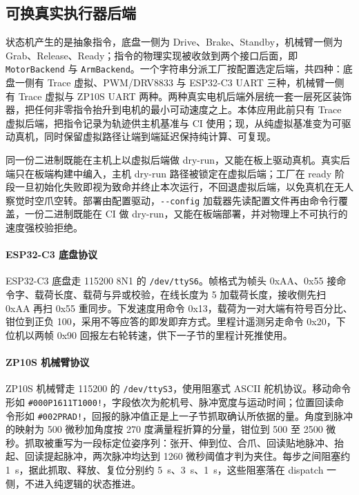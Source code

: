 \subsection{可换真实执行器后端}


状态机产生的是抽象指令，底盘一侧为 Drive、Brake、Standby，机械臂一侧为 Grab、Release、Ready；指令的物理实现被收敛到两个接口后面，即 \texttt{MotorBackend} 与 \texttt{ArmBackend}。一个字符串分派工厂按配置选定后端，共四种：底盘一侧有 Trace 虚拟、PWM/DRV8833 与 ESP32-C3 UART 三种，机械臂一侧有 Trace 虚拟与 ZP10S UART 两种。两种真实电机后端外层统一套一层死区装饰器，把任何非零指令抬升到电机的最小可动速度之上。本体应用此前只有 Trace 虚拟后端，把指令记录为轨迹供主机基准与 CI 使用；现，从纯虚拟基准变为可驱动真机，同时保留虚拟路径让端到端延迟保持纯计算、可复现。

同一份二进制既能在主机上以虚拟后端做 dry-run，又能在板上驱动真机。真实后端只在板端构建中编入，主机 dry-run 路径被锁定在虚拟后端；工厂在 ready 阶段一旦初始化失败即视为致命并终止本次运行，不回退虚拟后端，以免真机在无人察觉时空爪空转。部署由配置驱动，\texttt{-{}-config} 加载器先读配置文件再由命令行覆盖，一份二进制既能在 CI 做 dry-run，又能在板端部署，并对物理上不可执行的速度强校验拒绝。

\paragraph{ESP32-C3 底盘协议}
ESP32-C3 底盘走 115200 8N1 的 \texttt{/dev/ttyS6}。帧格式为帧头 0xAA、0x55 接命令字、载荷长度、载荷与异或校验，在线长度为 5 加载荷长度，接收侧先扫 0xAA 再扫 0x55 重同步。下发速度用命令 0x13，载荷为一对大端有符号百分比、钳位到正负 100，采用不等应答的即发即弃方式。里程计遥测另走命令 0x20，下位机以两帧 0x90 回报左右轮转速，供下一子节的里程计死推使用。

\paragraph{ZP10S 机械臂协议}
ZP10S 机械臂走 115200 的 \texttt{/dev/ttyS3}，使用阻塞式 ASCII 舵机协议。移动命令形如 \texttt{\#000P1611T1000!}，字段依次为舵机号、脉冲宽度与运动时间；位置回读命令形如 \texttt{\#002PRAD!}，回报的脉冲值正是上一子节抓取确认所依据的量。角度到脉冲的映射为 500 微秒加角度按 270 度满量程折算的分量，钳位到 500 至 2500 微秒。抓取被重写为一段标定位姿序列：张开、伸到位、合爪、回读贴地脉冲、抬起、回读提起脉冲，两次脉冲均达到 1260 微秒阈值才判为夹住。每步之间阻塞约 1~s，据此抓取、释放、复位分别约 5~s、3~s、1~s，这些阻塞落在 dispatch 一侧，不进入纯逻辑的状态推进。

